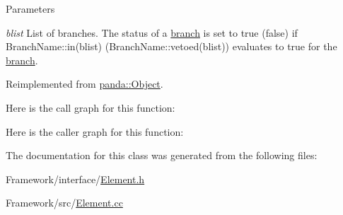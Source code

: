 \begin{DoxyParams}{Parameters}
\item[{\em blist}]List of branches. The status of a \hyperlink{namespacepanda_1_1branch}{branch} is set to true (false) if BranchName::in(blist) (BranchName::vetoed(blist)) evaluates to true for the \hyperlink{namespacepanda_1_1branch}{branch}. \end{DoxyParams}


Reimplemented from \hyperlink{classpanda_1_1Object_a282e820b1ad431db22ca4d4dd20b55e0}{panda::Object}.

Here is the call graph for this function:

Here is the caller graph for this function:

The documentation for this class was generated from the following files:\begin{DoxyCompactItemize}
\item 
Framework/interface/\hyperlink{Element_8h}{Element.h}\item 
Framework/src/\hyperlink{Element_8cc}{Element.cc}\end{DoxyCompactItemize}
